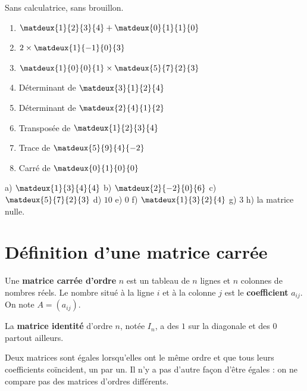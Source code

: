 \begin{automatismes}
Sans calculatrice, sans brouillon.

\begin{enumerate}[label=\textbf{\alph*)}, leftmargin=*, itemsep=0.25em]
  \item $\matdeux{1}{2}{3}{4}+\matdeux{0}{1}{1}{0}$
  \item $2 \times \matdeux{1}{-1}{0}{3}$
  \item $\matdeux{1}{0}{0}{1} \times \matdeux{5}{7}{2}{3}$
  \item Déterminant de $\matdeux{3}{1}{2}{4}$
  \item Déterminant de $\matdeux{2}{4}{1}{2}$
  \item Transposée de $\matdeux{1}{2}{3}{4}$
  \item Trace de $\matdeux{5}{9}{4}{-2}$
  \item Carré de $\matdeux{0}{1}{0}{0}$
\end{enumerate}
\end{automatismes}

\begin{corrige}[automatismes]
a) $\matdeux{1}{3}{4}{4}$ \quad b) $\matdeux{2}{-2}{0}{6}$ \quad
c) $\matdeux{5}{7}{2}{3}$ \quad d) $10$ \quad e) $0$ \quad
f) $\matdeux{1}{3}{2}{4}$ \quad g) $3$ \quad h) la matrice nulle.
\end{corrige}

\section{Définition d'une matrice carrée}

\begin{definition}
Une \textbf{matrice carrée d'ordre} $n$ est un tableau de $n$ lignes et $n$
colonnes de nombres réels. Le nombre situé à la ligne $i$ et à la colonne $j$
est le \textbf{coefficient} $a_{ij}$. On note $A = (a_{ij})$.

La \textbf{matrice identité} d'ordre $n$, notée $I_{n}$, a des $1$ sur la
diagonale et des $0$ partout ailleurs.
\end{definition}

\begin{remarque}
Deux matrices sont égales lorsqu'elles ont le même ordre et que tous leurs
coefficients coïncident, un par un. Il n'y a pas d'autre façon d'être égales :
on ne compare pas des matrices d'ordres différents.
\end{remarque}


